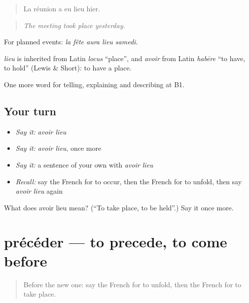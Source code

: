 \begin{quote}
La réunion a eu lieu hier.
\end{quote}

\begin{quote}
\emph{The meeting took place yesterday.}
\end{quote}

For planned events: \emph{la fête aura lieu samedi}.

\begin{cousinweb}
\emph{lieu} is inherited from Latin \emph{locus} \textquotedblleft{}place\textquotedblright{}, and \emph{avoir} from Latin \emph{habēre} \textquotedblleft{}to have, to hold\textquotedblright{} (Lewis \& Short): to have a place.
\end{cousinweb}

\begin{grammarlens}[title={What you've built}]
One more word for telling, explaining and describing at B1.
\end{grammarlens}

\subsection*{Your turn}
\begin{itemize}
\raggedright
  \item \emph{Say it:} \emph{avoir lieu}
  \item \emph{Say it:} \emph{avoir lieu}, once more
  \item \emph{Say it:} a sentence of your own with \emph{avoir lieu}
  \item \emph{Recall:} say the French for to occur, then the French for to unfold, then say \emph{avoir lieu} again
\end{itemize}

\begin{tcolorbox}[breakable,colback=teal!4,colframe=teal!35!black,title={Before you move on}]
What does avoir lieu mean? (\textquotedblleft{}To take place, to be held\textquotedblright{}.) Say it once more.
\end{tcolorbox}
\section[précéder]{précéder — to precede, to come before}

\label{lesson:FR-C274-preceder}



\begin{quote}
Before the new one: say the French for to unfold, then the French for to take place.
\end{quote}

